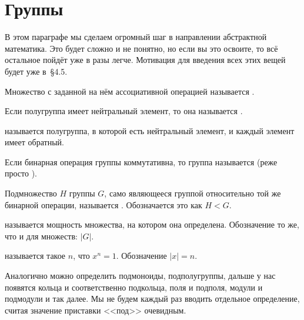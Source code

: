 \section{Группы}

В этом параграфе мы сделаем огромный шаг в направлении абстрактной математика. Это будет сложно и не понятно, но если вы это освоите, то всё остальное пойдёт уже в разы легче. Мотивация для введения всех этих вещей будет уже в~\S4.5.

\begin{definition}
	Множество с заданной на нём ассоциативной операцией называется .
\end{definition}

\begin{definition}
	Если полугруппа имеет нейтральный элемент, то она называется .
\end{definition}

\begin{definition}
	 называется полугруппа, в которой есть нейтральный элемент, и каждый элемент имеет обратный.
\end{definition}

\begin{definition}
	Если бинарная операция группы коммутативна, то группа называется  (реже просто ).
\end{definition}

\begin{definition}
	Подмножество $H$ группы $G$, само являющееся группой относительно той же бинарной операции, называется . Обозначается это как $H<G$.
\end{definition}

\begin{definition}
	 называется мощность множества, на котором она определена. Обозначение то же, что и для множеств: $|G|$.
\end{definition}

\begin{definition}
	 называется такое $n$, что $x^n = 1$. Обозначение $|x| = n$.
\end{definition}

Аналогично можно определить подмоноиды, подполугруппы, дальше у нас появятся кольца и соответственно подкольца, поля и подполя, модули и подмодули и так далее. Мы не будем каждый раз вводить отдельное определение, считая значение приставки <<под>> очевидным.

